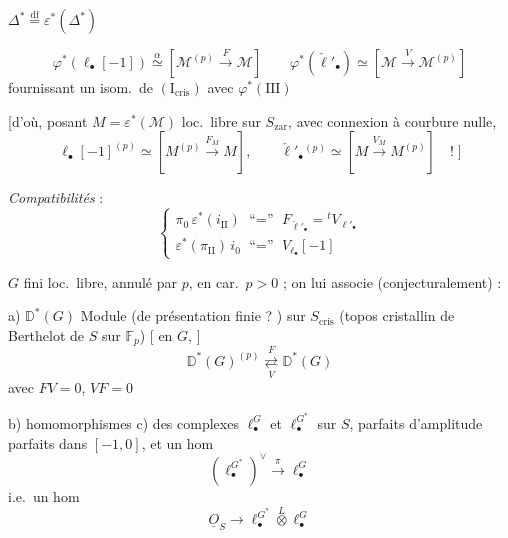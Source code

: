 \documentclass[11pt,a4paper]{article}
\begin{document}
\quad $\Delta^* \overset{\mathrm{df}}{=} \varepsilon^*(\Delta^*)$


\[
\varphi^*(\ell_\bullet[-1]) \overset{\alpha}{\simeq} [\mathcal{M}^{(p)} \xrightarrow{F} \mathcal{M}]
\qquad
\varphi^*(\check{\ell}'_\bullet) \simeq [\mathcal{M} \xrightarrow{V} \mathcal{M}^{(p)}]
\]
fournissant un \struck{\ill{}} isom.\ de $(\mathrm{I}_{\mathrm{cris}})$ avec
$\varphi^*(\mathrm{III})$

[d'où, posant $M = \varepsilon^*(\mathcal{M})$ loc.\ libre sur
$S_{\mathrm{zar}}$, avec connexion à courbure nulle,
\[
\ell_\bullet[-1]^{(p)} \simeq [M^{(p)} \xrightarrow{F_M} M],
\qquad
\check{\ell}'_\bullet{}^{(p)} \simeq [M \xrightarrow{V_M} M^{(p)}] \quad ! \;]
\]

\emph{Compatibilités} : 
\[
\begin{cases}
\pi_0\, \varepsilon^*(i_{\mathrm{II}}) \text{ ``$=$'' } F_{\check\ell'_\bullet} = {}^tV_{\ell'_\bullet} \\
\varepsilon^*(\pi_{\mathrm{II}})\, i_0 \text{ ``$=$'' } V_{\ell_\bullet}[-1]
\end{cases}
\]



$G$  fini loc.\ libre, annulé par $p$, en car.\ $p>0$ ;
on lui associe (conjecturalement) :

a) $\mathbb{D}^*(G)$ Module (de présentation finie ?
) sur $S_{\mathrm{cris}}$ (topos
cristallin de Berthelot de $S$ sur $\mathbb{F}_p$)
[ en $G$, \emph{}]
\[
\mathbb{D}^*(G)^{(p)} \underset{V}{\overset{F}{\rightleftarrows}} \mathbb{D}^*(G)
\]
avec $FV = 0$, $VF = 0$

b) homomorphismes
c) des complexes $\ell^{G}_\bullet$ et $\ell^{G^*}_\bullet$ sur $S$, parfaits
d'amplitude parfaits dans $[-1,0]$, et un hom
\[
(\ell^{G^*}_\bullet)^{\vee} \xrightarrow{\ \pi\ } \ell^{G}_\bullet
\]
i.e.\ un hom
\[
\underline{O}_S \longrightarrow \ell^{G^*}_\bullet \overset{L}{\otimes} \ell^{G}_\bullet
\]
\end{document}
